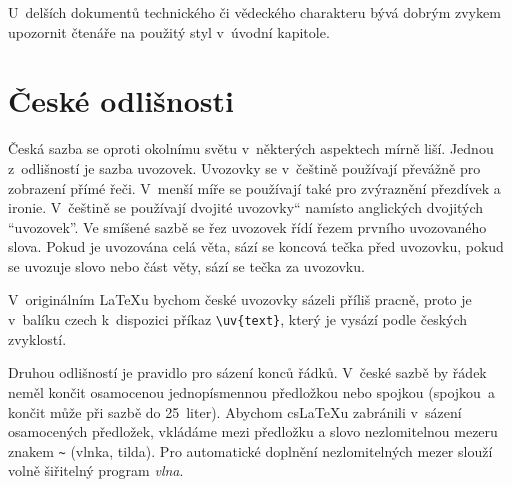 \documentclass[12pt,a4paper]{article}
\newcommand\uv[1]{\quotedblbase #1\textquotedblleft}
\begin{document}
U~delších dokumentů technického či vědeckého charakteru bývá dobrým zvykem upozornit čtenáře na použitý styl
v~úvodní kapitole.

\section{České odlišnosti}

Česká sazba se oproti okolnímu světu v~některých aspektech mírně liší. Jednou z~odlišností je sazba uvozovek.
Uvozovky se v~češtině používají převážně pro zobrazení přímé řeči. V~menší míře se používají také pro
zvýraznění přezdívek a ironie. V~češtině se používají dvojité \uv{uvozovky} namísto anglických dvojitých
``uvozovek''. Ve smíšené sazbě se řez uvozovek řídí řezem prvního uvozovaného slova. Pokud je uvozována celá
věta, sází se koncová tečka před uvozovku, pokud se uvozuje slovo nebo část věty, sází se tečka za uvozovku.

V~originálním \LaTeX{u} bychom české uvozovky sázeli příliš pracně, proto je v~balíku czech k~dispozici příkaz
\verb!\uv{text}!, který je vysází podle českých zvyklostí.

Druhou odlišností je pravidlo pro sázení konců řádků. V~české sazbě by řádek neměl končit osamocenou
jednopísmennou předložkou nebo spojkou (spojkou~a končit může při sazbě do 25~liter). Abychom cs\LaTeX{u}
zabránili v~sázení osamocených předložek, vkládáme mezi předložku a slovo nezlomitelnou mezeru znakem \verb!~!
(vlnka, tilda). Pro automatické doplnění nezlomitelných mezer slouží volně šiřitelný program \textit{vlna}.
\end{document}
